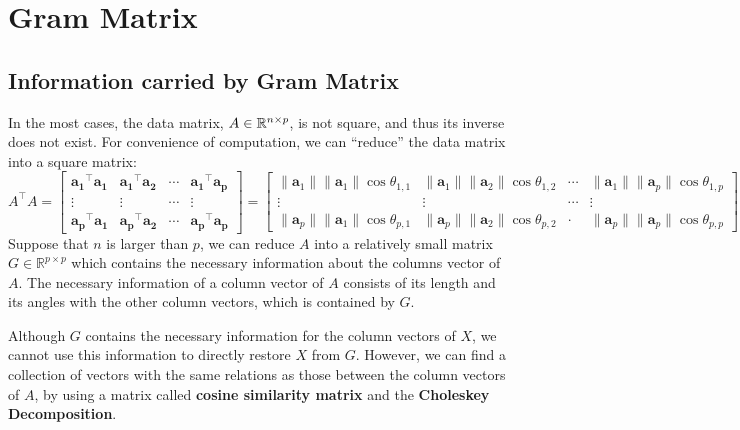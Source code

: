 \section{Gram Matrix}
\subsection{Information carried by Gram Matrix}
In the most cases, the data matrix, $A\in \mathbb{R}^{n\times p}$, is not square, and thus its inverse does not exist. For convenience of computation, we can \enquote{reduce} the data matrix into a square matrix:
\begin{equation}
    A^{\top}A = \begin{bmatrix}
        \mathbf{a_1}^{\top}\mathbf{a_1} & \mathbf{a_1}^{\top}\mathbf{a_2} & \cdots & \mathbf{a_1}^{\top}\mathbf{a_p}\\
        \vdots & \vdots & \cdots & \vdots\\
        \mathbf{a_p}^{\top}\mathbf{a_1} & \mathbf{a_p}^{\top}\mathbf{a_2} & \cdots & \mathbf{a_p}^{\top}\mathbf{a_p}
        \end{bmatrix}
         = 
        \begin{bmatrix}
            \lVert \mathbf{a}_1\rVert \lVert \mathbf{a}_1\rVert\cos \theta_{1, 1}  & \lVert \mathbf{a}_1\rVert \lVert \mathbf{a}_2\rVert\cos \theta_{1, 2} & \cdots & \lVert \mathbf{a}_1\rVert \lVert \mathbf{a}_p\rVert\cos \theta_{1, p}\\
            \vdots & \vdots & \cdots & \vdots\\
            \lVert \mathbf{a}_p\rVert \lVert \mathbf{a}_1\rVert\cos \theta_{p, 1}  & \lVert \mathbf{a}_p\rVert \lVert \mathbf{a}_2\rVert\cos \theta_{p, 2} & \cdot & \lVert \mathbf{a}_p\rVert \lVert \mathbf{a}_p\rVert\cos \theta_{p, p}
        \end{bmatrix}
\end{equation}
Suppose that $n$ is larger than $p$, we can reduce $A$ into a relatively small matrix $G\in \mathbb{R}^{p\times p}$ which contains the necessary information about the columns vector of $A$. The necessary information of a column vector of $A$ consists of its length and its angles with the other column vectors, which is contained by $G$.
\begin{Rem}
    Although $G$ contains the necessary information for the column vectors of $X$, we cannot use this information to directly restore $X$ from $G$. However, we can find a collection of vectors with the same relations as those between the column vectors of $A$, by using a matrix called \textbf{cosine similarity matrix} and the \textbf{Choleskey Decomposition}.
\end{Rem}

